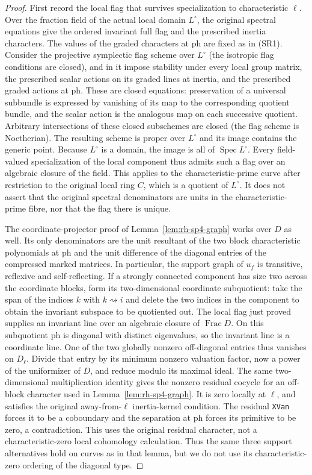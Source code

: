 \begin{proof}
First record the local flag that survives specialization
to characteristic \(\ell\).
Over the fraction field of the actual local domain
\(L^\circ\), the original spectral equations give the
ordered invariant full flag and the prescribed inertia
characters. The values of the graded characters at
\(\mathrm{ph}\) are fixed as in (SR1).
Consider the projective symplectic flag scheme over \(L^\circ\)
(the isotropic flag conditions are closed),
and in it impose stability under every local group
matrix, the prescribed scalar actions on its graded
lines at inertia, and the prescribed graded actions
at \(\mathrm{ph}\).
These are closed equations: preservation of a universal
subbundle is expressed by vanishing of its map to the
corresponding quotient bundle, and the scalar action
is the analogous map on each successive quotient.
Arbitrary intersections of these closed subschemes
are closed (the flag scheme is Noetherian).
The resulting scheme is proper over \(L^\circ\)
and its image contains the generic point.
Because \(L^\circ\) is a domain, the image is all of
\(\operatorname{Spec}L^\circ\).
Every field-valued specialization of the local component
thus admits such a flag over an algebraic closure of
the field. This applies to the characteristic-prime
curve after restriction to the original local ring
\(C\), which is a quotient of \(L^\circ\).
It does not assert that the original spectral
denominators are units in the characteristic-prime
fibre, nor that the flag there is unique.

The coordinate-projector proof of
Lemma~\ref{lem:rh-sp4-graph} works over \(D\) as well.
Its only denominators are the unit resultant of the
two block characteristic polynomials at \(\mathrm{ph}\)
and the unit difference of the diagonal entries of
the compressed marked matrices.
In particular, the support graph of \(u_f\) is
transitive, reflexive and self-reflecting.
If a strongly connected component has size two
across the coordinate blocks, form its two-dimensional
coordinate subquotient: take the span of the indices
\(k\) with \(k\rightsquigarrow i\) and delete the
two indices in the component to obtain the invariant
subspace to be quotiented out.
The local flag just proved supplies an invariant
line over an algebraic closure of \(\operatorname{Frac}D\).
On this subquotient \(\mathrm{ph}\) is diagonal with
distinct eigenvalues, so the invariant line is a
coordinate line. One of the two globally nonzero
off-diagonal entries thus vanishes on \(D_\ell\).
Divide that entry by its minimum nonzero valuation
factor, now a power of the uniformizer of \(D\),
and reduce modulo its maximal ideal.
The same two-dimensional multiplication identity
gives the nonzero residual cocycle for an off-block
character used in Lemma~\ref{lem:rh-sp4-graph}.
It is zero locally at \(\ell\), and satisfies the
original away-from-\(\ell\) inertia-kernel condition.
The residual \texttt{XVan} forces it to be a
coboundary and the separation at \(\mathrm{ph}\)
forces its primitive to be zero, a contradiction.
This uses the original residual character, not a
characteristic-zero local cohomology calculation.
Thus the same three support alternatives hold on
curves as in that lemma, but we do not use its
characteristic-zero ordering of the diagonal type.


\end{proof}
